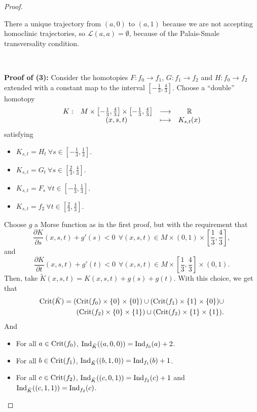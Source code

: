 \begin{proof}
\begin{rmrk}
There a unique trajectory from $(a,0)$ to $(a,1)$ because we are not accepting homoclinic trajectories, so $\mathcal{L}(a,a) = \emptyset$, because of the Palais-Smale transversality condition.
\end{rmrk}

\

{\bf Proof of (3):} Consider the homotopies $F : f_0 \rightarrow f_1$, $G : f_1 \rightarrow f_2$ and $H : f_0 \rightarrow f_2$ extended with a constant map to the interval $\left[-\frac13,\frac43\right]$. Choose a ``double'' homotopy
\begin{displaymath}
\begin{array}{rccc} K : & M \times \left[-\frac13, \frac43\right] \times \left[-\frac13, \frac43\right] & \longrightarrow & \mathbb{R} \\ & (x,s,t) & \longmapsto & K_{s,t}(x) \end{array}
\end{displaymath}
satisfying

\begin{itemize}
	\item $K_{s,t} = H_t \ \forall s \in \left[-\frac13,\frac13\right]$.
	\item $K_{s,t} = G_t \ \forall s \in \left[\frac23,\frac43\right]$.
	\item $K_{s,t} = F_s \ \forall t \in \left[-\frac13,\frac13\right]$.
	\item $K_{s,t} = f_2 \ \forall t \in \left[\frac23,\frac43\right]$.
\end{itemize}

Choose $g$ a Morse function as in the first proof, but with the requirement that
\begin{displaymath}
\frac{\partial K}{\partial s}(x,s,t) + g'(s) < 0 \ \ \forall (x,s,t) \in M \times (0,1) \times \left[\frac13,\frac43\right] ,
\end{displaymath}
and
\begin{displaymath}
\frac{\partial K}{\partial t}(x,s,t) + g'(t) < 0 \ \ \forall (x,s,t) \in M \times \left[\frac13,\frac43\right] \times (0,1) .
\end{displaymath}
Then, take $\tilde{K}(x,s,t) = K(x,s,t) + g(s) + g(t)$. With this choice, we get that
\begin{eqnarray*}
\mathrm{Crit}(\tilde{K}) = (\mathrm{Crit}(f_0)\times \{0\} \times \{0\}) \cup (\mathrm{Crit}(f_1) \times \{1\} \times \{0\}) \cup \\ (\mathrm{Crit}(f_2) \times \{0\} \times \{1\}) \cup (\mathrm{Crit}(f_2) \times \{1\} \times \{1\}) .
\end{eqnarray*}
And
\begin{itemize}
	\item For all $a \in \mathrm{Crit}(f_0)$, $\mathrm{Ind}_{\tilde{K}}((a,0,0)) = \mathrm{Ind}_{f_0}(a) + 2$.
	\item For all $b \in \mathrm{Crit}(f_1)$, $\mathrm{Ind}_{\tilde{K}}((b,1,0)) = \mathrm{Ind}_{f_1}(b) + 1$.
	\item For all $c \in \mathrm{Crit}(f_2)$, $\mathrm{Ind}_{\tilde{K}}((c,0,1)) = \mathrm{Ind}_{f_2}(c) + 1$ and $\mathrm{Ind}_{\tilde{K}}((c,1,1)) = \mathrm{Ind}_{f_2}(c)$.
\end{itemize}


\end{proof}
